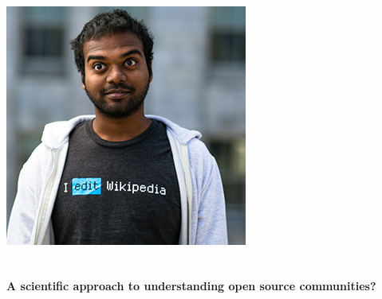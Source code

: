 \documentclass[xcolor=dvipsnames]{beamer}
\begin{document}
\begin{frame}
\begin{columns}
\begin{column}{0.3\linewidth}
\includegraphics[width=0.9\linewidth]{figures/yuvi.png}
\end{column}

\end{columns}
\end{frame}

\begin{frame}
\frametitle{}
{\Large \bf A scientific approach to understanding open source
communities?}
\end{frame}
\end{document}
